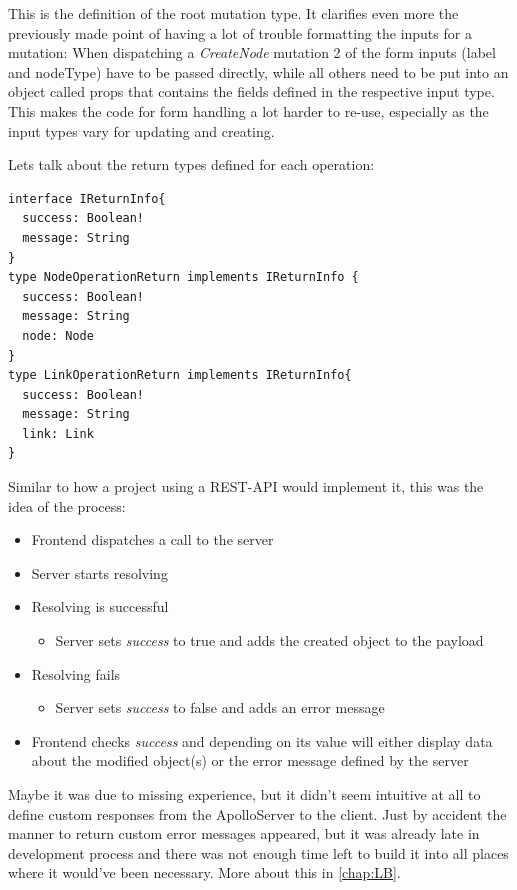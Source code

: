 This is the definition of the root mutation type. It clarifies even more the previously made point of having a lot of trouble formatting the inputs for a mutation: When dispatching a \emph{CreateNode} mutation 2 of the form inputs (label and nodeType) have to be passed directly, while all others need to be put into an object called props that contains the fields defined in the respective input type. This makes the code for form handling a lot harder to re-use, especially as the input types vary for updating and creating.

Lets talk about the return types defined for each operation:
\begin{lstlisting}[caption={Return Types}]
interface IReturnInfo{
  success: Boolean!
  message: String
}
type NodeOperationReturn implements IReturnInfo {
  success: Boolean!
  message: String
  node: Node
}
type LinkOperationReturn implements IReturnInfo{
  success: Boolean!
  message: String
  link: Link
}
\end{lstlisting}
Similar to how a project using a REST-API would implement it, this was the idea of the process:
\begin{itemize}
\item Frontend dispatches a call to the server
\item Server starts resolving
\item Resolving is successful
	\begin{itemize}
		\item Server sets \emph{success} to true and adds the created object to the payload
	\end{itemize}
\item Resolving fails
	\begin{itemize}
		\item Server sets \emph{success} to false and adds an error message
	\end{itemize}

\item Frontend checks \emph{success} and depending on its value will either display data about the modified object(s) or the error message defined by the server
\end{itemize}

Maybe it was due to missing experience, but it didn't seem intuitive at all to define custom responses from the ApolloServer to the client. Just by accident the manner to return custom error messages appeared, but it was already late in development process and there was not enough time left to build it into all places where it would've been necessary. More about this in \autoref{chap:LB}.

